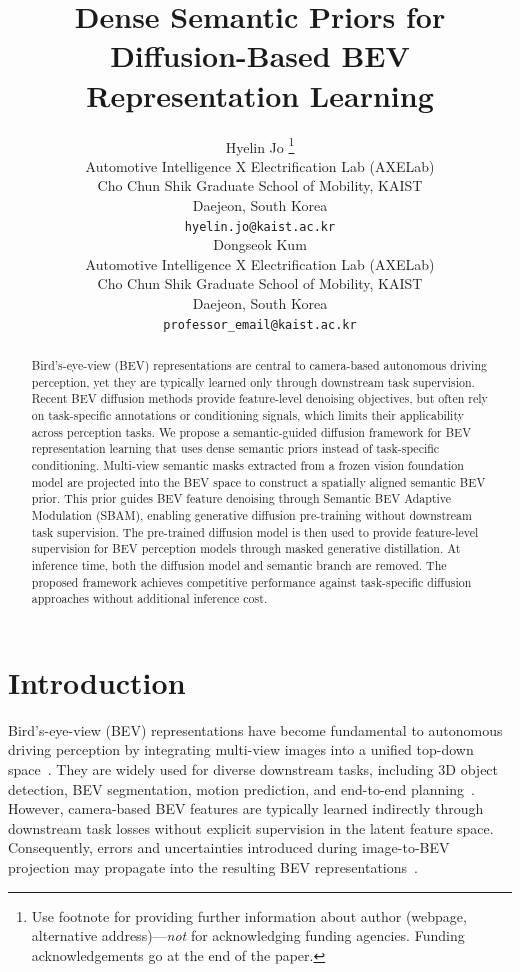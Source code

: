 \documentclass{article} %
\title{Dense Semantic Priors for Diffusion-Based BEV Representation Learning}
\author{Hyelin Jo \thanks{ Use footnote for providing further information
about author (webpage, alternative address)---\emph{not} for acknowledging
funding agencies.  Funding acknowledgements go at the end of the paper.} \\
Automotive Intelligence X Electrification Lab (AXELab) \\
Cho Chun Shik Graduate School of Mobility, KAIST \\
Daejeon, South Korea \\
\texttt{hyelin.jo@kaist.ac.kr} \\
\And
Dongseok Kum \\
Automotive Intelligence X Electrification Lab (AXELab) \\
Cho Chun Shik Graduate School of Mobility, KAIST \\
Daejeon, South Korea \\
\texttt{professor_email@kaist.ac.kr}
}
\begin{document}
\maketitle

\begin{abstract}
Bird's-eye-view (BEV) representations are central to camera-based autonomous
driving perception, yet they are typically learned only through downstream task
supervision. Recent BEV diffusion methods provide feature-level denoising
objectives, but often rely on task-specific annotations or conditioning signals,
which limits their applicability across perception tasks. We propose a
semantic-guided diffusion framework for BEV representation learning that uses
dense semantic priors instead of task-specific conditioning. Multi-view semantic
masks extracted from a frozen vision foundation model are projected into the BEV
space to construct a spatially aligned semantic BEV prior. This prior guides BEV
feature denoising through Semantic BEV Adaptive Modulation (SBAM), enabling
generative diffusion pre-training without downstream task supervision. The
pre-trained diffusion model is then used to provide feature-level supervision
for BEV perception models through masked generative distillation. At inference
time, both the diffusion model and semantic branch are removed. The proposed
framework achieves competitive performance against task-specific diffusion
approaches without additional inference cost.
\end{abstract}


\section{Introduction}
Bird's-eye-view (BEV) representations have become fundamental to autonomous
driving perception by integrating multi-view images into a unified top-down
space~\citep{SUR1,SUR2,BVF}. They are widely used for diverse downstream tasks,
including 3D object detection, BEV segmentation, motion prediction, and
end-to-end planning~\citep{SUR2,BVF,LSS,UniAD,VAD}. However, camera-based BEV
features are typically learned indirectly through downstream task losses without
explicit supervision in the latent feature space. Consequently, errors and
uncertainties introduced during image-to-BEV projection may propagate into the
resulting BEV representations~\citep{BEVDiff,DiffBEV}.
\end{document}
